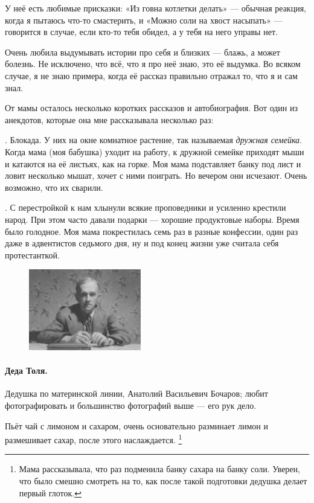 \documentclass{book}
\begin{document}
У неё есть любимые присказки: «Из говна котлетки делать» --- обычная реакция, когда я пытаюсь что-то смастерить, и «Можно соли на хвост насыпать» --- говорится в случае, если кто-то тебя обидел, а у тебя на него управы нет.

Очень любила выдумывать истории про себя и близких --- блажь, а может болезнь.
Не исключено, что всё, что я про неё знаю, это её выдумка.
Во всяком случае, я не знаю примера, когда её рассказ правильно отражал то, что я и сам знал.

От мамы осталось несколько коротких рассказов и автобиография.
Вот один из анекдотов, которые она мне рассказывала несколько раз:

.
Блокада. 
У них на окне комнатное растение, так называемая \textit{дружная семейка}.
Когда мама (моя бабушка) уходит на работу, к дружной семейке приходят мыши и катаются на её листьях, как на горке.
Моя мама подставляет банку под лист и ловит несколько мышат, хочет с ними поиграть.
Но вечером они исчезают.
Очень возможно, что их сварили.

.
С перестройкой к нам хлынули всякие проповедники и усиленно крестили народ.
При этом часто давали подарки --- хорошие продуктовые наборы.
Время было голодное.
Моя мама покрестилась семь раз в разные конфессии, один раз даже в адвентистов седьмого дня,
ну и под конец жизни уже считала себя протестанткой.

\begin{figure}
\vskip-4mm
\centering
\includegraphics[width=49mm,angle=0]{pics/deda-tolya}
\end{figure}

\paragraph{Деда Толя.}
Дедушка по материнской линии,
Анатолий Васильевич Бочаров; любит фотографировать и большинство фотографий выше --- его рук дело.

Пьёт чай с лимоном и сахаром, очень основательно разминает лимон и размешивает сахар, после этого наслаждается.%
\footnote{Мама рассказывала, что раз подменила банку сахара на банку соли.
Уверен, что было смешно смотреть на то, как после такой подготовки дедушка делает первый глоток.}
\end{document}
